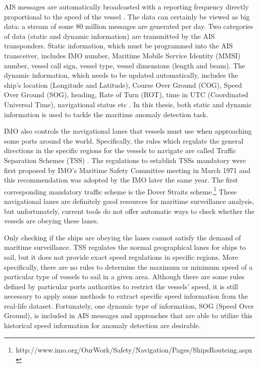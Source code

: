 \documentclass[12pt,glossary]{dalcsthesis}
\begin{document}
AIS messages are automatically broadcasted with a reporting frequency directly proportional to the speed of the vessel \cite{kde}.  The data can certainly be viewed as big data: a stream of some 80 million messages are generated per day. Two categories of data (static and dynamic information) are transmitted by the AIS transponders. Static information, which must be programmed into the AIS transceiver,  includes IMO number, Maritime Mobile Service Identity (MMSI) number, vessel call sign, vessel type, vessel dimensions (length and beam). The dynamic information, which needs to be updated automatically, includes the ship's location (Longitude and Latitude), Course Over Ground (COG), Speed Over Ground (SOG), heading, Rate of Turn (ROT), time in UTC (Coordinated Universal Time), navigational status etc \cite{IALA}. In this thesis, both static and dynamic information is used to tackle the maritime anomaly detection task.


IMO also controls the navigational lanes that vessels must use when approaching some ports around the world. Specifically, the rules which regulate the general directions in the specific regions for the vessels to navigate are called Traffic Separation Schemes (TSS) \cite{tss}.  The regulations to establish TSSs mandatory were first proposed by IMO's Maritime Safety Committee meeting in March 1971 and this recommendation was adopted by the IMO later the same year. The first corresponding mandatory traffic scheme is the Dover Straits scheme.\footnote{http://www.imo.org/OurWork/Safety/Navigation/Pages/ShipsRouteing.aspx} These navigational lanes are definitely good resources for maritime surveillance analysis, but unfortunately, current tools do not offer automatic ways to check whether the vessels are obeying these lanes. 

 Only checking if the ships are obeying the lanes cannot satisfy the demand of maritime surveillance. TSS regulates the normal geographical lanes for ships to sail, but it does not provide exact speed regulations in specific regions. More specifically, there are no rules to determine the maximum or minimum speed of a particular type of vessels to sail in a given area. Although there are some rules defined by particular ports authorities to restrict the vessels' speed, it is still necessary to apply some methods to extract specific speed information from the real-life dataset.  Fortunately, one dynamic type of information, SOG (Speed Over Ground), is included in AIS messages and approaches that are able to utilize this historical speed information for anomaly detection are desirable.
\end{document}
